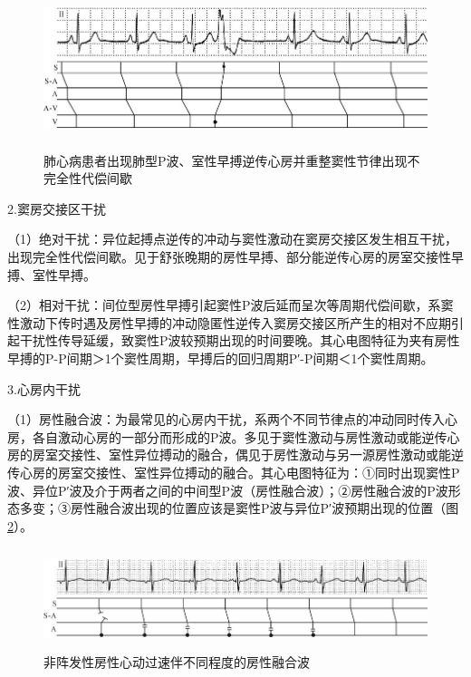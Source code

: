\begin{figure}[!htbp]
 \centering
 \includegraphics[width=5.79167in,height=1.82292in]{./images/Image00442.jpg}
 \captionsetup{justification=centering}
 \caption{肺心病患者出现肺型P波、室性早搏逆传心房并重整窦性节律出现不完全性代偿间歇}
 \label{fig26-1}
  \end{figure} 

2.窦房交接区干扰

（1）绝对干扰：异位起搏点逆传的冲动与窦性激动在窦房交接区发生相互干扰，出现完全性代偿间歇。见于舒张晚期的房性早搏、部分能逆传心房的房室交接性早搏、室性早搏。

（2）相对干扰：间位型房性早搏引起窦性P波后延而呈次等周期代偿间歇，系窦性激动下传时遇及房性早搏的冲动隐匿性逆传入窦房交接区所产生的相对不应期引起干扰性传导延缓，致窦性P波较预期出现的时间要晚。其心电图特征为夹有房性早搏的P-P间期＞1个窦性周期，早搏后的回归周期P′-P间期＜1个窦性周期。

3.心房内干扰

（1）房性融合波：为最常见的心房内干扰，系两个不同节律点的冲动同时传入心房，各自激动心房的一部分而形成的P波。多见于窦性激动与房性激动或能逆传心房的房室交接性、室性异位搏动的融合，偶见于房性激动与另一源房性激动或能逆传心房的房室交接性、室性异位搏动的融合。其心电图特征为：①同时出现窦性P波、异位P′波及介于两者之间的中间型P波（房性融合波）；②房性融合波的P波形态多变；③房性融合波出现的位置应该是窦性P波与异位P′波预期出现的位置（图\ref{fig26-2}）。

\begin{figure}[!htbp]
 \centering
 \includegraphics[width=5.80208in,height=1.16667in]{./images/Image00443.jpg}
 \captionsetup{justification=centering}
 \caption{非阵发性房性心动过速伴不同程度的房性融合波}
 \label{fig26-2}
  \end{figure} 

